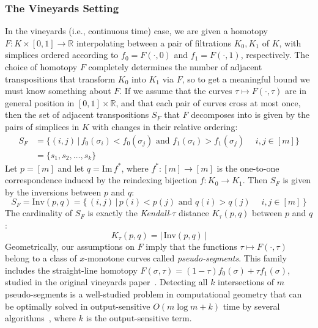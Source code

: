 \documentclass{article} %
\begin{document}
\subsubsection{The Vineyards Setting}\label{sec:continuous_setting}
In the vineyards (i.e., continuous time) case, we are given a homotopy $F : K \times [0,1] \to \mathbb{R}$ interpolating between  a pair of filtrations $K_0, K_1$ of $K$, with simplices  ordered according to $f_0 = F(\cdot, 0)$ and $f_1 = F(\cdot, 1)$, respectively. 
The choice of homotopy $F$ completely determines the number of adjacent transpositions that transform $K_0$ into $K_1$ via $F$, so to get a meaningful bound we must know something about $F$. 
If we assume that the curves $\tau \mapsto F(\cdot, \tau)$  are in general position in $[0,1]\times \mathbb{R}$, and that each pair of curves cross  at most once, then the set of adjacent transpositions $S_F$ that $F$ decomposes into is given by the pairs of simplices in $K$ with changes in their relative ordering:
\begin{align}\label{eq:sf_schedule}
	S_F &= \{ (i,j) \, | \, f_0(\sigma_i) < f_0(\sigma_j) \mbox{ and }  f_1(\sigma_i) > f_1(\sigma_j) \quad  \; i,j \in [m] \} \\
	&= \{ s_1, s_2, \dots, s_k \}
\end{align}
Let $p = [m]$ and let $q = \mathrm{Im}\,f^\ast$, where $f^\ast : [m] \to [m]$ is the one-to-one correspondence induced by the reindexing bijection $f: K_0 \to K_1$. Then $S_F$ is given by the inversions between $p$ and $q$:
\[S_F = 
\mathrm{Inv}(p, q) = \{ \, (i,j) \, | \, p(i) < p(j) \mbox{ and } q(i) > q(j)  \quad \; i,j \in [m]\, \}
\]
The cardinality of $  S_F $ is exactly the \emph{Kendall}-$\tau$ distance $K_\tau(p,q)$ between $p$ and $q$: 
\begin{equation}\label{eq:kendall_dist}
	K_\tau(p, q) = \lvert \, \mathrm{Inv}(p, q) \, \rvert
\end{equation}
Geometrically, our assumptions on $F$ imply that the  functions $\tau\mapsto F(\cdot, \tau)$ belong to a class of $x$-monotone curves called \emph{pseudo-segments}.
This family includes 
the straight-line homotopy $F(\sigma, \tau) = (1 - \tau) f_0(\sigma) + \tau f_1(\sigma)$,   studied in the original vineyards paper~\cite{cohen2006vines}. Detecting all $k$ intersections of $m$ pseudo-segments is a well-studied problem in computational geometry that can be optimally solved in output-sensitive $O(m \log m + k)$ time by several algorithms~\cite{boissonnat2000efficient}, where $k$ is the output-sensitive term. 
\end{document}
